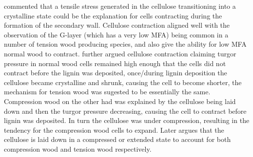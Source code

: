 \citet{wardrop1965} commented that a tensile stress generated in the cellulose
transitioning into a crystalline state could be the explanation for cells
contracting during the formation of the secondary wall. Cellulose contraction
aligned well with the observation of the G-layer (which has a very low
MFA) being common in a number of tension wood producing species, and also give
the ability for low MFA normal wood to contract. \citet{Bamber1979} further argued
cellulose contraction claiming turgor pressure in normal wood cells remained
high enough that the cells did not contract before the lignin was deposited,
once/during lignin deposition the cellulose became crystalline and shrunk,
causing the cell to become shorter, the mechanism for tension wood was sugested to be
essentially the same. Compression wood on the other had was explained by the
cellulose being laid down and then the turgor pressure decreasing, causing the
cell to contract before lignin was deposited. In turn the cellulose was under
compression, resulting in the tendency for the compression wood cells to
expand. Later \citet{bamber2001general} argues that the cellulose is laid down in a compressed or extended state to account for both compression wood and tension wood respectively. 